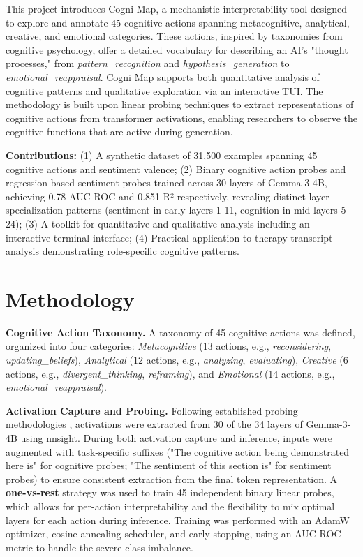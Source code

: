 \documentclass[letterpaper]{article}
\begin{document}
This project introduces Cogni Map, a mechanistic interpretability tool designed to explore and annotate 45 cognitive actions spanning metacognitive, analytical, creative, and emotional categories. These actions, inspired by taxonomies from cognitive psychology, offer a detailed vocabulary for describing an AI's "thought processes," from \textit{pattern\_recognition} and \textit{hypothesis\_generation} to \textit{emotional\_reappraisal}. Cogni Map supports both quantitative analysis of cognitive patterns and qualitative exploration via an interactive TUI. The methodology is built upon linear probing techniques \cite{alain2016understanding} to extract representations of cognitive actions from transformer activations, enabling researchers to observe the cognitive functions that are active during generation.

\textbf{Contributions:} (1) A synthetic dataset of 31,500 examples spanning 45 cognitive actions and sentiment valence; (2) Binary cognitive action probes and regression-based sentiment probes trained across 30 layers of Gemma-3-4B, achieving 0.78 AUC-ROC and 0.851 R² respectively, revealing distinct layer specialization patterns (sentiment in early layers 1-11, cognition in mid-layers 5-24); (3) A toolkit for quantitative and qualitative analysis including an interactive terminal interface; (4) Practical application to therapy transcript analysis demonstrating role-specific cognitive patterns.

\section{Methodology}

\textbf{Cognitive Action Taxonomy.} A taxonomy of 45 cognitive actions was defined, organized into four categories: \textit{Metacognitive} (13 actions, e.g., \textit{reconsidering}, \textit{updating\_beliefs}), \textit{Analytical} (12 actions, e.g., \textit{analyzing}, \textit{evaluating}), \textit{Creative} (6 actions, e.g., \textit{divergent\_thinking}, \textit{reframing}), and \textit{Emotional} (14 actions, e.g., \textit{emotional\_reappraisal}).

\textbf{Activation Capture and Probing.} Following established probing methodologies \cite{alain2016understanding,chen2024designing}, activations were extracted from 30 of the 34 layers of Gemma-3-4B using nnsight. During both activation capture and inference, inputs were augmented with task-specific suffixes ("The cognitive action being demonstrated here is" for cognitive probes; "The sentiment of this section is" for sentiment probes) to ensure consistent extraction from the final token representation. A \textbf{one-vs-rest} strategy was used to train 45 independent binary linear probes, which allows for per-action interpretability and the flexibility to mix optimal layers for each action during inference. Training was performed with an AdamW optimizer, cosine annealing scheduler, and early stopping, using an AUC-ROC metric to handle the severe class imbalance.
\end{document}
